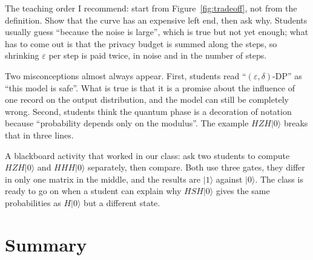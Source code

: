 \begin{untukdosen}
The teaching order I recommend: start from Figure~\ref{fig:tradeoff}, not from the
definition. Show that the curve has an expensive left end, then ask why. Students usually
guess ``because the noise is large'', which is true but not yet enough; what has to come
out is that the privacy budget is summed along the steps, so shrinking $\varepsilon$ per
step is paid twice, in noise and in the number of steps.

Two misconceptions almost always appear. First, students read ``$(\varepsilon,\delta)$-DP''
as ``this model is safe''. What is true is that it is a promise about the influence of one
record on the output distribution, and the model can still be completely wrong. Second,
students think the quantum phase is a decoration of notation because ``probability depends
only on the modulus''. The example $HZH|0\rangle$ breaks that in three lines.

A blackboard activity that worked in our class: ask two students to compute
$HZH|0\rangle$ and $HHH|0\rangle$ separately, then compare. Both use three gates, they
differ in only one matrix in the middle, and the results are $|1\rangle$ against
$|0\rangle$. The class is ready to go on when a student can explain why $HSH|0\rangle$
gives the same probabilities as $H|0\rangle$ but a different state.
\end{untukdosen}

\section{Summary}

